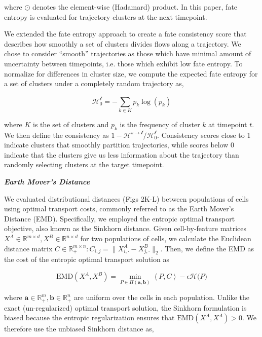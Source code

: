 where \(\odot\) denotes the element-wise (Hadamard) product. In this
paper, fate entropy is evaluated for trajectory clusters at the next
timepoint.

We extended the fate entropy approach to create a fate consistency score
that describes how smoothly a set of clusters divides flows along a
trajectory. We chose to consider ``smooth'' trajectories as those which
have minimal amount of uncertainty between timepoints, i.e. those which
exhibit low fate entropy. To normalize for differences in cluster size,
we compute the expected fate entropy for a set of clusters under a
completely random trajectory as,

\[\mathcal{H}_{0}^{\mathcal{t}} = - \sum_{k \in K}^{}{p_{k}\log\left( p_{k} \right)}\]

where \(K\) is the set of clusters and \(p_{k}\) is the frequency of
cluster \(k\) at timepoint \(t\). We then define the consistency as
\(1 - \mathcal{H}^{s \rightarrow \mathcal{t}}/\mathcal{H}_{0}^{\mathcal{t}}\).
Consistency scores close to 1 indicate clusters that smoothly partition
trajectories, while scores below 0 indicate that the clusters give us
less information about the trajectory than randomly selecting clusters
at the target timepoint.

\emph{\textbf{Earth Mover's Distance}}

We evaluated distributional distances (Figs 2K-L) between populations of
cells using optimal transport costs, commonly referred to as the Earth
Mover's Distance (EMD). Specifically, we employed the entropic optimal
transport objective, also known as the Sinkhorn distance. Given
cell-by-feature matrices
\(X^{A} \in \mathbb{R}^{m \times d},X^{B} \in \mathbb{R}^{n \times d}\)
for two populations of cells, we calculate the Euclidean distance matrix
\(C \in \mathbb{R}_{+}^{m \times n}:C_{i,j} = \left. \parallel X_{i, \cdot}^{A} - X_{j, \cdot}^{B} \right.\parallel_{2}\).
Then, we define the EMD as the cost of the entropic optimal transport
solution as

\[\mathrm{\text{EMD}}(X^{A},X^{B}) = \underset{P \in \Pi(\mathbf{a},\mathbf{b})}{\mathrm{\min}}\left\langle P,C \right\rangle - \epsilon\mathcal{H(}P)\]

where
\(\mathbf{a} \in \mathbb{R}_{+}^{m},\mathbf{b} \in \mathbb{R}_{+}^{n}\)
are uniform over the cells in each population. Unlike the exact
(un-regularized) optimal transport solution, the Sinkhorn formulation is
biased because the entropic regularization ensures that
\(\mathrm{\text{EMD}}(X^{A},X^{A}) > 0\). We therefore use the unbiased
Sinkhorn distance as,

